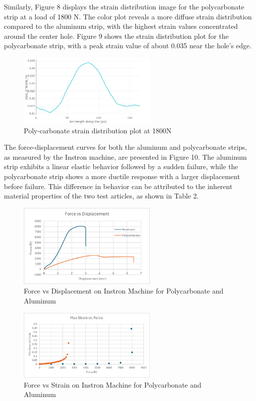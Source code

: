 \documentclass{article}
\begin{document}
Similarly, Figure 8 displays the strain distribution image for the polycarbonate strip at a load of 1800 N. The color plot reveals a more diffuse strain distribution compared to the aluminum strip, with the highest strain values concentrated around the center hole. Figure 9 shows the strain distribution plot for the polycarbonate strip, with a peak strain value of about 0.035 near the hole's edge.

\begin{figure}[H]
    \centering
    \includegraphics[width = 0.6\textwidth]{lab9images/1800Npcplot_strainyy.png}
    \caption{Poly-carbonate strain distribution plot at 1800N}
    \label{fig:PC1800Nplot}
\end{figure}

The force-displacement curves for both the aluminum and polycarbonate strips, as measured by the Instron machine, are presented in Figure 10. The aluminum strip exhibits a linear elastic behavior followed by a sudden failure, while the polycarbonate strip shows a more ductile response with a larger displacement before failure. This difference in behavior can be attributed to the inherent material properties of the two test articles, as shown in Table 2.

\begin{figure}[H]
    \centering
    \includegraphics[width = 0.6\textwidth]{lab9images/forcevsdisplacement.png}
    \caption{Force vs Displacement on Instron Machine for Polycarbonate and Aluminum}
    \label{fig:forcedisplacement}
\end{figure}

\begin{figure}[H]
    \centering
    \includegraphics[width = 0.6\textwidth]{lab9images/strainvsforce.png}
    \caption{Force vs Strain on Instron Machine for Polycarbonate and Aluminum}
    \label{fig:strainforce}
\end{figure}
\end{document}

